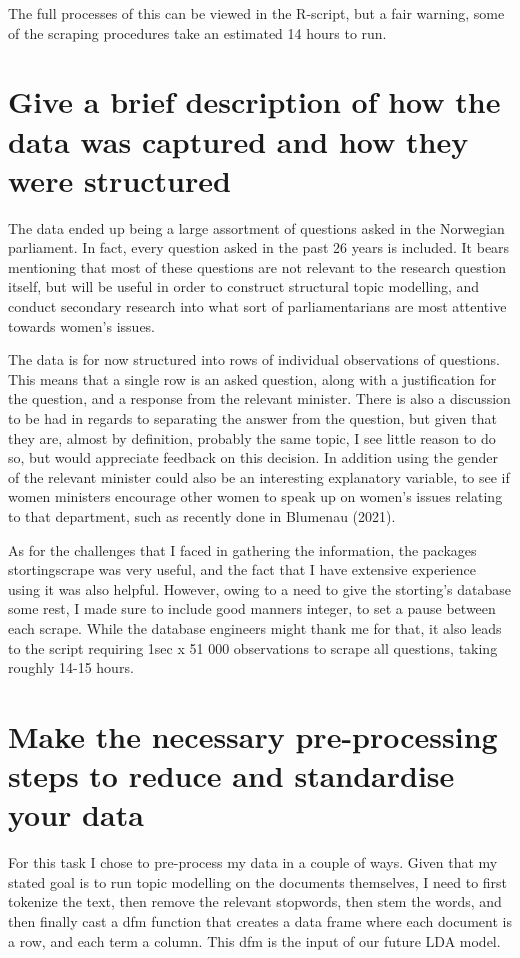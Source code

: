 \documentclass[12pt]{article}
\begin{document}
	The full processes of this can be viewed in the R-script, but a fair warning, some of the scraping procedures take an estimated 14 hours to run. 
	
	\section{Give a brief description of how the data was captured and how they were structured}
	
	The data ended up being a large assortment of questions asked in the Norwegian parliament. In fact, every question asked in the past 26 years is included. It bears mentioning that most of these questions are not relevant to the research question itself, but will be useful in order to construct structural topic modelling, and conduct secondary research into what sort of parliamentarians are most attentive towards women's issues. 
	
	The data is for now structured into rows of individual observations of questions. This means that a single row is an asked question, along with a justification for the question, and a response from the relevant minister. There is also a discussion to be had in regards to separating the answer from the question, but given that they are, almost by definition, probably the same topic, I see little reason to do so, but would appreciate feedback on this decision. In addition using the gender of the relevant minister could also be an interesting explanatory variable, to see if women ministers encourage other women to speak up on women's issues relating to that department, such as recently done in Blumenau (2021). 
	
	As for the challenges that I faced in gathering the information, the packages stortingscrape was very useful, and the fact that I have extensive experience using it was also helpful. However, owing to a need to give the storting's database some rest, I made sure to include good manners integer, to set a pause between each scrape. While the database engineers might thank me for that, it also leads to the script requiring 1sec x 51 000 observations to scrape all questions, taking roughly 14-15 hours. 
	
	\section{Make the necessary pre-processing steps to reduce and standardise your data}
	
	For this task I chose to pre-process my data in a couple of ways. Given that my stated goal is to run topic modelling on the documents themselves, I need to first tokenize the text, then remove the relevant stopwords, then stem the words, and then finally cast a dfm function that creates a data frame where each document is a row, and each term a column. This dfm is the input of our future LDA model. 
	
\end{document}

